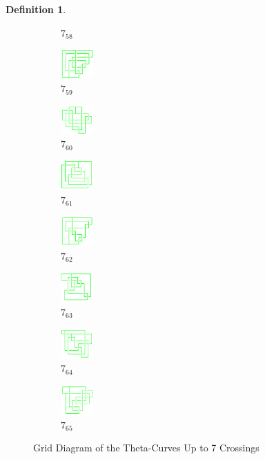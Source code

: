\documentclass{article}
\theoremstyle{definition}
\newtheorem{defn}[thm]{Definition}
\theoremstyle{theorem}
\theoremstyle{proposition}
\theoremstyle{corollary}
\begin{document}
\begin{defn}
\begin{figure}[H]
\begin{subfigure}{0.075\textwidth}
    \caption{$7_{58}$} 
    \end{subfigure}
    \begin{subfigure}{0.075\textwidth}
    \includegraphics[width=1.25cm]{../Midterm_Poster/grid_diagram/theta_7_59.png}
    \caption{$7_{59}$} 
    \end{subfigure}
    \begin{subfigure}{0.075\textwidth}
    \includegraphics[width=1.25cm]{../Midterm_Poster/grid_diagram/theta_7_60.png}
    \caption{$7_{60}$} 
    \end{subfigure}
    \begin{subfigure}{0.075\textwidth}
    \includegraphics[width=1.25cm]{../Midterm_Poster/grid_diagram/theta_7_61.png}
    \caption{$7_{61}$} 
    \end{subfigure}
    \begin{subfigure}{0.075\textwidth}
    \includegraphics[width=1.25cm]{../Midterm_Poster/grid_diagram/theta_7_62.png}
    \caption{$7_{62}$} 
    \end{subfigure}
    \begin{subfigure}{0.075\textwidth}
    \includegraphics[width=1.25cm]{../Midterm_Poster/grid_diagram/theta_7_63.png}
    \caption{$7_{63}$} 
    \end{subfigure}
    \begin{subfigure}{0.075\textwidth}
    \includegraphics[width=1.25cm]{../Midterm_Poster/grid_diagram/theta_7_64.png}
    \caption{$7_{64}$} 
    \end{subfigure}
    \begin{subfigure}{0.075\textwidth}
    \includegraphics[width=1.25cm]{../Midterm_Poster/grid_diagram/theta_7_65.png}
    \caption{$7_{65}$} 
    \end{subfigure}
    \caption{Grid Diagram of the Theta-Curves Up to 7 Crossings}
  \end{figure}


\end{defn}
\end{document}
